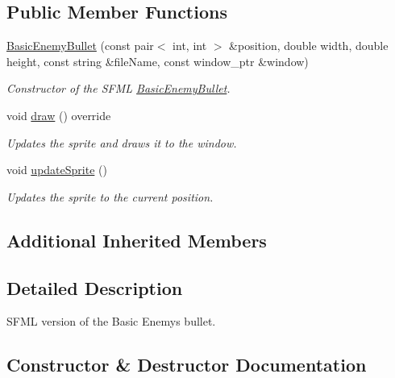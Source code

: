 \subsection*{Public Member Functions}
\begin{DoxyCompactItemize}
\item 
\hyperlink{classGameSFML_1_1BasicEnemyBullet_aa2daeed3aec6be3661879afaae0855d1}{Basic\+Enemy\+Bullet} (const pair$<$ int, int $>$ \&position, double width, double height, const string \&file\+Name, const window\+\_\+ptr \&window)
\begin{DoxyCompactList}\small\item\em Constructor of the S\+F\+ML \hyperlink{classGameSFML_1_1BasicEnemyBullet}{Basic\+Enemy\+Bullet}. \end{DoxyCompactList}\item 
void \hyperlink{classGameSFML_1_1BasicEnemyBullet_af970b7b86c5a21963daac86822a064a2}{draw} () override
\begin{DoxyCompactList}\small\item\em Updates the sprite and draws it to the window. \end{DoxyCompactList}\item 
void \hyperlink{classGameSFML_1_1BasicEnemyBullet_a12e639b51bc2212fd35af3d8fb0bbb56}{update\+Sprite} ()
\begin{DoxyCompactList}\small\item\em Updates the sprite to the current position. \end{DoxyCompactList}\end{DoxyCompactItemize}
\subsection*{Additional Inherited Members}


\subsection{Detailed Description}
S\+F\+ML version of the Basic Enemy\textquotesingle{}s bullet. 

\subsection{Constructor \& Destructor Documentation}
\mbox{\label{classGameSFML_1_1BasicEnemyBullet_aa2daeed3aec6be3661879afaae0855d1}} 
